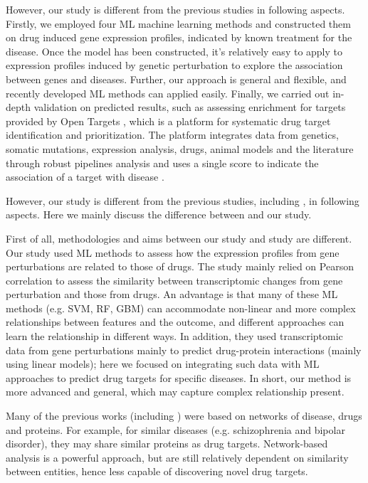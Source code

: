     However, our study is different from the previous studies in following aspects. Firstly, we employed four ML machine learning methods and constructed them on drug induced gene expression profiles, indicated by known treatment for the disease. Once the model has been constructed, it’s relatively easy to apply to expression profiles induced by genetic perturbation to explore the association between genes and diseases. Further, our approach is general and flexible, and recently developed ML methods can applied easily. Finally, we carried out in-depth validation on predicted results, such as assessing enrichment for targets provided by Open Targets \cite{koscielny2017open}, which is a platform for systematic drug target identification and prioritization. The platform integrates data from genetics, somatic mutations, expression analysis, drugs, animal models and the literature through robust pipelines analysis and uses a single score to indicate the association of a target with disease \cite{koscielny2017open}.

    However, our study is different from the previous studies, including \cite{sawada2018predicting}, in following aspects. Here we mainly discuss the difference between \cite{sawada2018predicting} and our study. 

    First of all, methodologies and aims between our study and study \cite{sawada2018predicting} are different. Our study used ML methods to assess how the expression profiles from gene perturbations are related to those of drugs. The study mainly relied on Pearson correlation to assess the similarity between transcriptomic changes from gene perturbation and those from drugs. An advantage is that many of these ML methods (e.g. SVM, RF, GBM) can accommodate non-linear and more complex relationships between features and the outcome, and different approaches can learn the relationship in different ways. In addition, they used transcriptomic data from gene perturbations mainly to predict drug-protein interactions (mainly using linear models); here we focused on integrating such data with ML approaches to predict drug targets for specific diseases. In short, our method is more advanced and general, which may capture complex relationship present. 

    Many of the previous works (including \cite{sawada2018predicting, li2015large, emig2013drug}) were based on networks of disease, drugs and proteins. For example, for similar diseases (e.g. schizophrenia and bipolar disorder), they may share similar proteins as drug targets. Network-based analysis is a powerful approach, but are still relatively dependent on similarity between entities, hence less capable of discovering novel drug targets. 

